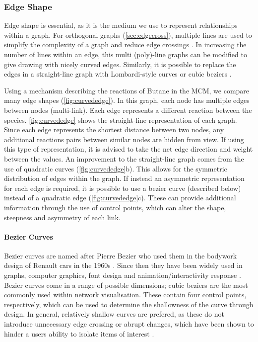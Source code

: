 \subsubsection{Edge Shape}
Edge shape is essential, as it is the medium we use to represent relationships within a graph. For orthogonal graphs (\autoref{sec:edgecross}), multiple lines are used to simplify the complexity of a graph and reduce edge crossings \citep{ortho}. In increasing the number of lines within an edge, this multi (poly)-line graphs can be modified to give drawing with nicely curved edges. Similarly, it is possible to replace the edges in a straight-line graph with Lombardi-style curves or cubic beziers \citep{lombardi,bezier}.

Using a mechanism describing the reactions of Butane in the MCM, we compare many edge shapes (\autoref{fig:curvededge}). In this graph, each node has multiple edges between nodes (multi-link). Each edge represents a different reaction between the species. \autoref{fig:curvededge} shows the straight-line representation of each graph. Since each edge represents the shortest distance between two nodes, any additional reactions pairs between similar nodes are hidden from view. If using this type of representation, it is advised to take the net edge direction and weight between the values. An improvement to the straight-line graph comes from the use of quadratic curves (\autoref{fig:curvededge}b). This allows for the symmetric distribution of edges within the graph. If instead an asymmetric representation for each edge is required, it is possible to use a bezier curve (described below) instead of a quadratic edge (\autoref{fig:curvededge}c). These can provide additional information through the use of control points, which can alter the shape, steepness and asymmetry of each link.

\paragraph*{Bezier Curves}
Bezier curves are named after Pierre Bezier who used them in the bodywork design of Renault cars in the 1960s \citep{beziermath}. Since then they have been widely used in graphs, computer graphics, font design and animation/interactivity response \citep{bezier,beziermath,beziercomputer}. Bezier curves come in a range of possible dimensions; cubic beziers are the most commonly used within network visualisation. These contain four control points, respectively, which can be used to determine the shallowness of the curve through design. In general, relatively shallow curves are prefered, as these do not introduce unnecessary edge crossing or abrupt changes, which have been shown to hinder a users ability to isolate items of interest \citep{ch6graphredability}.


